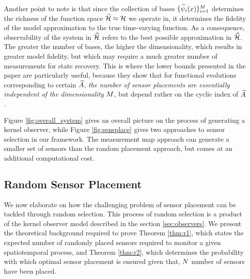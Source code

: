 Another point to note is that since the collection of bases $\{\widehat{\psi}_i(x)\}_{i=1}^{M}$ determines the richness of the function space $\widehat{\mathcal{H}}\approx\mathcal{H}$ we operate in, it determines the fidelity of the model approximation to the true time-varying function. As a consequence, observability of the system in $\widehat{\mathcal{H}}$ refers to the best possible approximation in $\widehat{\mathcal{H}}$. The greater the number of bases, the higher the dimensionality, which results in greater model fidelity, but which may require a much greater number of measurements for state recovery. This is where the lower bounds presented in the paper are particularly useful, because they show that for functional evolutions corresponding to certain $\widehat{A}$, \emph{the number of sensor placements are essentially independent of the dimensionality $M$}, but depend rather on the cyclic index of $\widehat{A}$.

Figure \ref{fig:overall_system} gives an overall picture on the process of generating a kernel observer, while Figure \ref{fig:sensplace} gives two approaches to sensor selection in our framework. The measurement map approach can generate a smaller set of sensors than the random placement approach, but comes at an additional computational cost. 

\subsection{Random Sensor Placement}\label{sec:random_results}
We now elaborate on how the challenging problem of sensor placement can be tackled through random selection. This process of random selection is a product of the kernel observer model described in the section \ref{sec:observers}. We present the theoretical background required to prove Theorem \ref{thm:r1}, which states the expected number of randomly placed sensors required to monitor a given spatiotemporal process, and Theorem \ref{thm:r2}, which determines the probability with which optimal sensor placement is ensured given that, $N$ number of sensors have been placed. 

